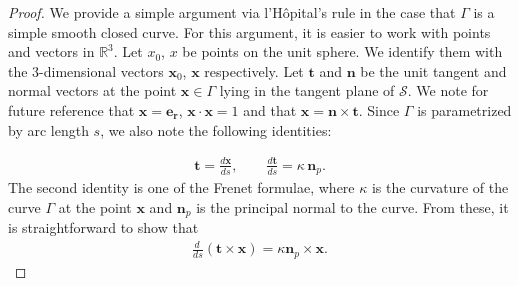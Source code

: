 \begin{proof}

We provide a simple argument via l'H\^{o}pital's rule in the case that
$\Gamma$ is a simple smooth closed curve. For this argument, it is
easier  to work with points and vectors in $\mathbb{R}^3$.  Let $x_0$,
$x$ be points on the unit sphere. We identify them with the
3-dimensional vectors $\mathbf{x}_{0}$, $\mathbf{x}$ respectively.  Let
$\mathbf{t}$ and $\mathbf{n}$ be the unit tangent and normal vectors
at the point $\mathbf{x} \in \Gamma$ lying in the tangent plane of
$\mathcal{S}$.  We note for future reference that
$\mathbf{x}=\mathbf{e_r}$, $\mathbf{x} \cdot \mathbf{x} = 1$ and that
$\mathbf{x} = \mathbf{n} \times \mathbf{t}$. Since $\Gamma$ is
parametrized by arc length $s$, we also note the following identities:

\begin{align*}
  \mathbf{t} = \frac{d\mathbf{x}}{ds}, \qquad 
  \frac{d\mathbf{t}}{ds} = \kappa \, \mathbf{n}_{p}.
\end{align*}
The second identity is one of the Frenet formulae, where $\kappa$ is
the curvature of the curve $\Gamma$ at the point $\mathbf{x}$ and
$\mathbf{n}_{p}$ is the principal normal to the curve.  From these, it
is straightforward to show that 
\begin{align*}
  \frac{d \, }{ds} \left( \mathbf{t} \times \mathbf{x} \right)=
  \kappa \mathbf{n}_{p} \times \mathbf{x} . 
\end{align*}


\end{proof}
